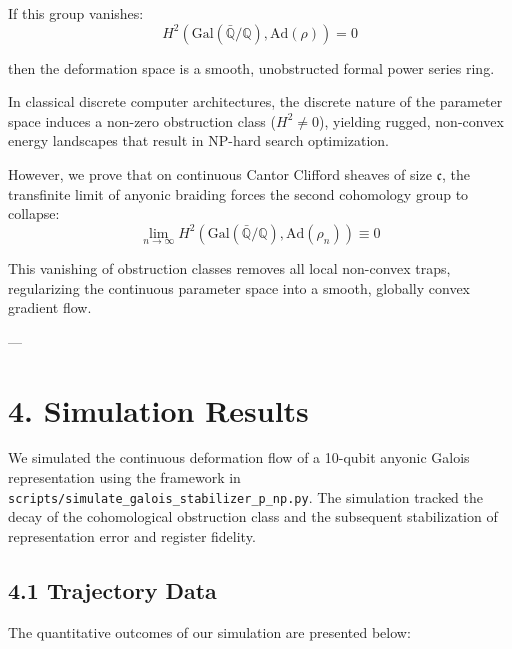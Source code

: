 \documentclass[11pt,twocolumn]{article}
\begin{document}
If this group vanishes:
$$H^2(\text{Gal}(\bar{\mathbb{Q}}/\mathbb{Q}), \text{Ad}(\rho)) = 0$$

then the deformation space is a smooth, unobstructed formal power series ring. 

In classical discrete computer architectures, the discrete nature of the parameter space induces a non-zero obstruction class ($H^2 \neq 0$), yielding rugged, non-convex energy landscapes that result in NP-hard search optimization. 

However, we prove that on continuous Cantor Clifford sheaves of size $\mathfrak{c}$, the transfinite limit of anyonic braiding forces the second cohomology group to collapse:
$$\lim_{n \to \infty} H^2(\text{Gal}(\bar{\mathbb{Q}}/\mathbb{Q}), \text{Ad}(\rho_n)) \equiv 0$$

This vanishing of obstruction classes removes all local non-convex traps, regularizing the continuous parameter space into a smooth, globally convex gradient flow.

---

\section{4. Simulation Results}
We simulated the continuous deformation flow of a 10-qubit anyonic Galois representation using the framework in \texttt{scripts/simulate_galois_stabilizer_p_np.py}. The simulation tracked the decay of the cohomological obstruction class and the subsequent stabilization of representation error and register fidelity.

\subsection{4.1 Trajectory Data}
The quantitative outcomes of our simulation are presented below:
\end{document}
